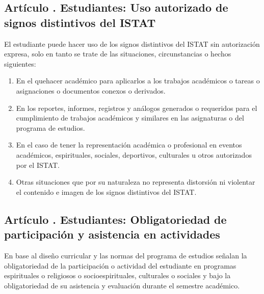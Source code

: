 \subsection{Artículo . Estudiantes: Uso autorizado de signos distintivos del ISTAT}
\addtocounter{ns}{1}
El estudiante puede hacer uso de los signos distintivos del ISTAT sin autorización expresa, solo en tanto se trate de las situaciones, circunstancias o hechos siguientes: 
\begin{enumerate}
\item En el quehacer académico para aplicarlos a los trabajos académicos o tareas o asignaciones o documentos conexos o derivados. 
\item En los reportes, informes, registros y análogos generados o requeridos para el cumplimiento de trabajos académicos y similares en las asignaturas o del programa de estudios. 
\item En el caso de tener la representación académica o profesional en eventos académicos, espirituales, sociales, deportivos, culturales u otros autorizados por el ISTAT. 
\item Otras situaciones que por su naturaleza no representa distorsión ni violentar el contenido e imagen de los signos distintivos del ISTAT. 
\end{enumerate}
\subsection{Artículo . Estudiantes: Obligatoriedad de participación y asistencia en actividades}
\addtocounter{ns}{1}
En base al diseño curricular y las normas del programa de estudios señalan la obligatoriedad de la participación o actividad del estudiante en programas espirituales o religiosos o socioespirituales, culturales o sociales y bajo la obligatoriedad de su asistencia y evaluación durante el semestre académico. 

